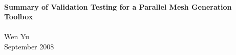 \documentclass[12pt,titlepage]{article}
\author{Wen Yu}
\begin{document}
\begin{titlepage}

\newcommand{\texttl}{\textsf} %
\newcommand{\textau}{\textsf} %

\begin{center}
 
\HRule \\[0.4cm]
{ \huge \bfseries \texttl{Summary of Validation Testing for a Parallel Mesh Generation Toolbox}}\\[0.4cm]
 
\HRule \\[2cm]

\textau{\LARGE Wen Yu}\\[2cm]
 
\textau{\LARGE {September 2008}}
 
\vfill
 
\hfill
\textau{\LARGE
{}
}
\end{center}

\end{titlepage}

\tableofcontents

 \label{RefiningMesh}
 \label{CoarseningMesh}
 \label{RefiningOrCoarsening}
 \label{MeshType}
 \label{ElmShape}
 \label{DomainDimension}
 \label{Conformal}
 \label{InputDefinition}
 \label{RCInstruction}
 \label{OutputStorage}
 \label{VertexUniqueID}
 \label{ElmUniqueID}
 \label{ElmTopology}
 \label{OutElmOrder}
 \label{OutVertexOrder}
 \label{Help}
 \label{Performance}
 \label{Precision}
 \label{Exception}
 \label{Portability}
 \label{LookAndFeel}
 \label{Usability}
 \label{Maintainability}
\end{document}
